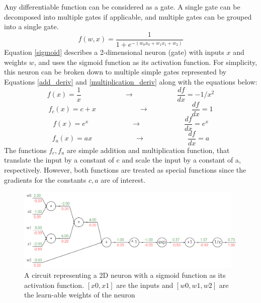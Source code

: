 Any differentiable function can be considered as a gate. A single gate can be decomposed into multiple gates if applicable, and multiple gates can be grouped into a single gate.
\begin{equation}
f(w,x) = \frac{1}{1+e^{-(w_0x_0 + w_1x_1 + w_2)}}
\label{sigmoid}
\end{equation}
Equation \ref{sigmoid} describes a 2-dimensional neuron (gate) with inputs \(x\) and weights \(w\), and uses the sigmoid function as its activation function. For simplicity, this neuron can be broken down to multiple simple gates represented by Equations \ref{add_deriv} and \ref{multiplication_deriv} along with the equations below:
\begin{equation}
f(x) = \frac{1}{x} 
\hspace{1in} \rightarrow \hspace{1in} 
\frac{df}{dx} = -1/x^2 
\end{equation}
\begin{equation}
f_c(x) = c + x
\hspace{1in} \rightarrow \hspace{1in} 
\frac{df}{dx} = 1 
\end{equation}
\begin{equation}
f(x) = e^x
\hspace{1in} \rightarrow \hspace{1in} 
\frac{df}{dx} = e^x
\end{equation}
\begin{equation}
f_a(x) = ax
\hspace{1in} \rightarrow \hspace{1in} 
\frac{df}{dx} = a
\end{equation}
The functions \(f_c,f_a\) are simple addition and multiplication function, that translate the input by a constant of c and scale the input by a constant of a, respectively. However, both functions are treated as special functions since the gradients for the constants \(c,a\) are of interest. 

\begin{figure}[!ht]
\includegraphics[trim={0cm 0cm 0cm 0cm},clip,width=\linewidth]{Figures/sigmoid.png}
\centering
\caption{A circuit representing a 2D neuron with a sigmoid function as its activation function. \([x0,x1]\) are the inputs  and \([w0,w1,w2]\) are the learn-able weights of the neuron}
\label{signmoid_circuit}
\end{figure}

